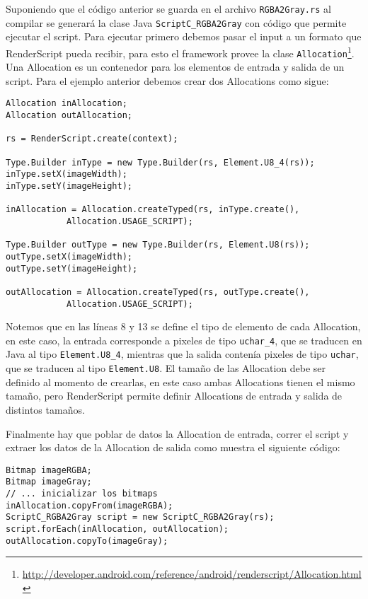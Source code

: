 Suponiendo que el código anterior se guarda en el archivo \texttt{RGBA2Gray.rs} al compilar se generará la clase Java
\texttt{ScriptC\_RGBA2Gray} con código que permite ejecutar el script. Para ejecutar primero debemos pasar el input a un formato que RenderScript pueda recibir, para esto el framework provee la clase \texttt{Allocation}\footnote{\url{http://developer.android.com/reference/android/renderscript/Allocation.html}}. Una Allocation es un contenedor para los elementos de entrada y salida de un script. Para el ejemplo anterior debemos crear dos Allocations como sigue:

\begin{lstlisting}[style=JavaInputStyle]
Allocation inAllocation;
Allocation outAllocation;

rs = RenderScript.create(context);

Type.Builder inType = new Type.Builder(rs, Element.U8_4(rs));
inType.setX(imageWidth);
inType.setY(imageHeight);

inAllocation = Allocation.createTyped(rs, inType.create(),
            Allocation.USAGE_SCRIPT);

Type.Builder outType = new Type.Builder(rs, Element.U8(rs));
outType.setX(imageWidth);
outType.setY(imageHeight);

outAllocation = Allocation.createTyped(rs, outType.create(),
            Allocation.USAGE_SCRIPT);
\end{lstlisting}

Notemos que en las líneas 8 y 13 se define el tipo de elemento de cada Allocation, en este caso, la entrada corresponde a pixeles de tipo \texttt{uchar\_4}, que se traducen en Java al tipo \texttt{Element.U8\_4}, mientras que la salida contenía pixeles de tipo \texttt{uchar}, que se traducen al tipo \texttt{Element.U8}. El tamaño de las Allocation debe ser definido al momento de crearlas, en este caso ambas Allocations tienen el mismo tamaño, pero RenderScript permite definir Allocations de entrada y salida de distintos tamaños.

Finalmente hay que poblar de datos la Allocation de entrada, correr el script y extraer los datos de la Allocation de salida como muestra el siguiente código:

\begin{lstlisting}[style=JavaInputStyle]
Bitmap imageRGBA;
Bitmap imageGray;
// ... inicializar los bitmaps
inAllocation.copyFrom(imageRGBA);
ScriptC_RGBA2Gray script = new ScriptC_RGBA2Gray(rs);
script.forEach(inAllocation, outAllocation);
outAllocation.copyTo(imageGray);
\end{lstlisting}

